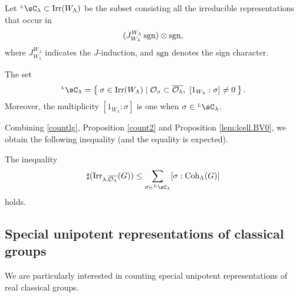 \documentclass[counting_main.tex]{subfiles}
\begin{document}
Let $\LC_{\lambda}\subset \Irr(W_\Lambda)$ be the subset consisting all the irreducible representations that occur in
  \[
    (J_{W_{\lambda}}^{W_{\Lambda}} \operatorname{sgn} )\otimes \operatorname{sgn},
  \]
where $J_{W_{\lambda}}^{W_{\Lambda}} $ indicates the $J$-induction, and $\operatorname{sgn}$ denotes the sign character.



 \begin{prop}\label{lem:lcell.BV0}
 The set
 \[
    \LC_{\lambda} = \Set{\sigma\in  \Irr(W_\Lambda)\mid \CO_\sigma\subset \overline{\CO_\lambda}, \    [1_{W_{\lambda}}:\sigma]\neq 0}.
   \]
  Moreover, the multiplicity $[1_{W_{\lambda}}:\sigma]$ is one
  when $\sigma\in \LC_\lambda$.
\end{prop}

Combining \eqref{countlg}, Proposition \ref{count2}
and Proposition \ref{lem:lcell.BV0}, we obtain the following inequality (and the equality is expected).

\begin{cor}
 The inequality
  \begin{equation}\label{boundc}
    \sharp(\Irr_{\lambda,\overline{\CO_\lambda}}(G)) \leq \sum_{\sigma\in \LC_\lambda} [\sigma: \Coh_{\Lambda}(G)]
  \end{equation}
  holds.
\end{cor}



\subsection{Special unipotent representations of classical groups}

We are particularly interested in counting special unipotent representations of  real classical groups.
\end{document}
